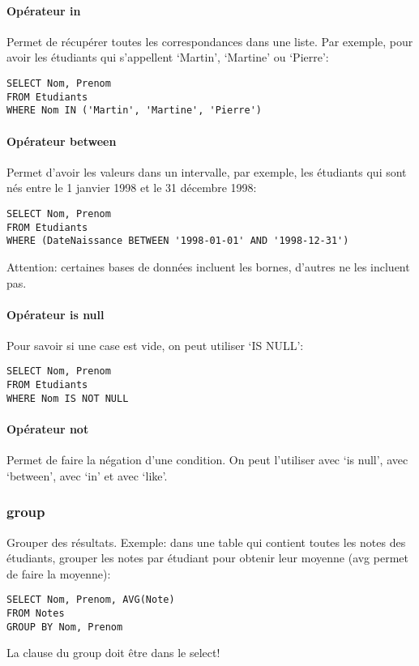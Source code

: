 \documentclass[10pt,a4paper,french]{article}
\begin{document}
\paragraph{Opérateur \gls{in}}
Permet de récupérer toutes les correspondances dans une liste. Par exemple, pour avoir les étudiants qui s'appellent `Martin', `Martine' ou `Pierre':
\begin{verbatim}
SELECT Nom, Prenom
FROM Etudiants
WHERE Nom IN ('Martin', 'Martine', 'Pierre')
\end{verbatim}

\paragraph{Opérateur \gls{between}}
Permet d'avoir les valeurs dans un intervalle, par exemple, les étudiants qui sont nés entre le 1 janvier 1998 et le 31 décembre 1998:
\begin{verbatim}
SELECT Nom, Prenom
FROM Etudiants
WHERE (DateNaissance BETWEEN '1998-01-01' AND '1998-12-31')
\end{verbatim}
Attention: certaines bases de données incluent les bornes, d'autres ne les incluent pas.

\paragraph{Opérateur \gls{is} \gls{null}}
Pour savoir si une case est vide, on peut utiliser `IS NULL':
\begin{verbatim}
SELECT Nom, Prenom
FROM Etudiants
WHERE Nom IS NOT NULL
\end{verbatim}

\paragraph{Opérateur \gls{not}}
Permet de faire la négation d'une condition. On peut l'utiliser avec `\gls{is} \gls{null}', avec `\gls{between}', avec `\gls{in}' et avec `\gls{like}'.

\subsubsection{\gls{group}}

Grouper des résultats. Exemple: dans une table qui contient toutes les notes des étudiants, grouper les notes par étudiant pour obtenir leur moyenne (\gls{avg} permet de faire la moyenne):
\begin{verbatim}
SELECT Nom, Prenom, AVG(Note)
FROM Notes
GROUP BY Nom, Prenom
\end{verbatim}
La clause du \gls{group} doit être dans le \gls{select}!
\end{document}
